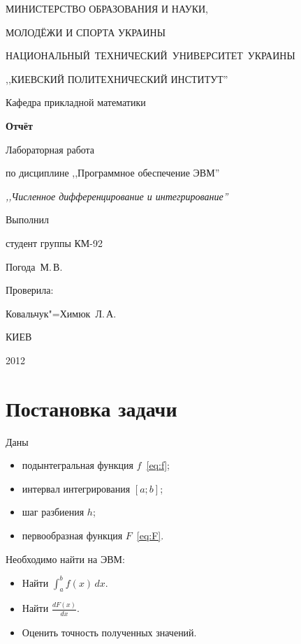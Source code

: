 \documentclass[a4paper,12pt,notitlepage,headsepline,pdftex]{scrartcl}
\begin{document}
\begin{titlepage}
  \begin{center}
    \large
    \MakeUppercase{Министерство образования и науки,}

    \MakeUppercase{молодёжи и спорта Украины}

    \mbox{\MakeUppercase{Национальный технический университет Украины}}

    \MakeUppercase{,,Киевский политехнический институт''}

    \addvspace{6pt}

    \normalsize
    Кафедра прикладной математики

    \vfill

    \textbf{Отчёт}

    Лабораторная работа 

    по дисциплине ,,Программное обеспечение ЭВМ''

    \emph{,,Численное дифференцирование и интегрирование''}
  \end{center}

  \vfill

  \noindent
  \begin{minipage}{0.3\textwidth}
    Выполнил

    студент группы КМ-92

    Погода~М.\,В.
  \end{minipage}
  \hfill
  \begin{minipage}{0.4\textwidth}
    Проверила:

    Ковальчук"=Химюк~Л.\,А.
  \end{minipage}
  \vfill

  \begin{center}
    КИЕВ

    2012
  \end{center}
\end{titlepage}
\tableofcontents
\newpage
\section{Постановка задачи}
  Даны
  \begin{itemize}
    \item подынтегральная функция $f$~\eqref{eq:f};
    \item интервал интегрирования $\left[ a; b \right]$;
    \item шаг разбиения $h$;
    \item первообразная функция $F$~\eqref{eq:F}.
  \end{itemize}
  Необходимо найти на ЭВМ:
  \begin{itemize}
    \item Найти $\displaystyle\int_a^b f\left( x \right)\,dx$.
    \item Найти $\displaystyle\frac{dF\left( x \right)}{dx}$.
    \item Оценить точность полученных значений.
  \end{itemize}
\end{document}
